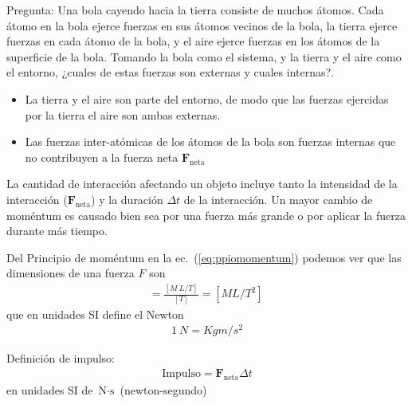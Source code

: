  

\begin{frame}
  \begin{block}%
{Pregunta:} Una bola cayendo hacia la tierra consiste de muchos
  átomos. Cada átomo en la bola ejerce fuerzas en sus átomos vecinos
  de la bola, la tierra ejerce fuerzas en cada átomo de la bola, y el
  aire ejerce fuerzas en los átomos de la superficie de la
  bola. Tomando la bola como el sistema, y la tierra y el aire como el
  entorno, ¿cuales de estas fuerzas son externas y cuales internas?.
    
  \end{block}

  
\end{frame}

\begin{frame}
\begin{itemize}
  \item     \alert{La tierra y el aire} son parte del entorno, de modo que las fuerzas
    ejercidas por la tierra el aire son ambas \alert{externas}.
  \item Las fuerzas \alert{inter-atómicas} de los átomos de la bola son
    fuerzas \alert{internas} que no contribuyen a la fuerza neta $\mathbf{F}_{\text{neta}}$
  \end{itemize}
  
\end{frame}

\begin{frame}
  La cantidad de interacción afectando un objeto incluye tanto la \alert{intensidad de la interacción} ($\mathbf{F}_{\text{neta}}$) y la \alert{duración} $\Delta t$ de la interacción. Un mayor cambio de moméntum es causado bien sea por una fuerza más grande o por aplicar la fuerza durante más tiempo.
\end{frame}

Del Principio de moméntum en la ec.~(\ref{eq:ppiomomentum}) podemos ver que las dimensiones de una fuerza $F$ son 
\begin{align*}
[F]=\frac{[M\ L/T]}{[T]}=[M L/T^2]\,
\end{align*}
que en unidades SI define el Newton 
\begin{align*}
\SI{1}{N}=\si{Kg m/s^2}
\end{align*}

\begin{frame}
{Definición de impulso:}
\begin{align}
  \text{Impulso}=\mathbf{F}_{\text{neta}}\Delta t
\end{align}
en unidades SI de $\text{N}\cdot\text{s}$ (newton-segundo)
\end{frame}

